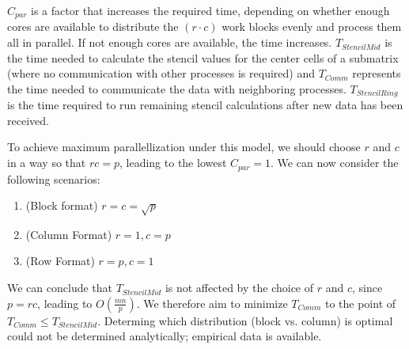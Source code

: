 \documentclass[11pt]{article}
\begin{document}
$C_{par}$ is a factor that increases the required time, depending on whether enough cores are available to distribute the $(r \cdot c)$ work blocks evenly and process them all in parallel. If not enough cores are available, the time increases. $T_{StencilMid}$ is the time needed to calculate the stencil values for the center cells of a submatrix (where no communication with other processes is required) and $T_{Comm}$ represents the time needed to communicate the data with neighboring processes. $T_{StencilRing}$ is the time required to run remaining stencil calculations after new data has been received.

To achieve maximum parallellization under this model, we should choose $r$ and $c$ in a way so that $rc = p$, leading to the lowest $C_{par} = 1$. We can now consider the following scenarios:

\begin{enumerate}
\item (Block format) $r = c = \sqrt{p}$ 
\item (Column Format) $r = 1, c = p$
\item (Row Format) $r = p, c = 1$
\end{enumerate}

We can conclude that $T_{StencilMid}$ is not affected by the choice of $r$ and $c$, since $p = rc$, leading to $O(\frac{mn}{p})$. We therefore aim to minimize $T_{Comm}$ to the point of $T_{Comm} \leq T_{StencilMid}$. Determing which distribution (block vs. column) is optimal could not be determined analytically; empirical data is available.
\end{document}
